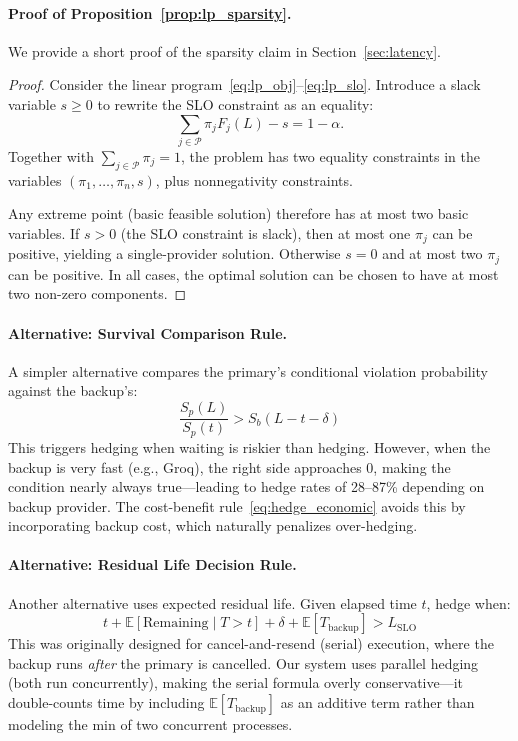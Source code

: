 \paragraph{Proof of Proposition~\ref{prop:lp_sparsity}.}
\label{app:lp_sparsity_proof}
We provide a short proof of the sparsity claim in Section~\ref{sec:latency}.
\begin{proof}
Consider the linear program~\eqref{eq:lp_obj}--\eqref{eq:lp_slo}. Introduce a slack variable $s \ge 0$ to rewrite the SLO constraint as an equality:
\[
\sum_{j \in \mathcal{P}} \pi_j F_j(L) - s = 1 - \alpha.
\]
Together with $\sum_{j \in \mathcal{P}} \pi_j = 1$, the problem has two equality constraints in the variables $(\pi_1, \ldots, \pi_n, s)$, plus nonnegativity constraints.

Any extreme point (basic feasible solution) therefore has at most two basic variables. If $s > 0$ (the SLO constraint is slack), then at most one $\pi_j$ can be positive, yielding a single-provider solution. Otherwise $s = 0$ and at most two $\pi_j$ can be positive. In all cases, the optimal solution can be chosen to have at most two non-zero components.
\end{proof}

\paragraph{Alternative: Survival Comparison Rule.}
A simpler alternative compares the primary's conditional violation probability against the backup's:
\[
\frac{S_p(L)}{S_p(t)} > S_b(L - t - \delta)
\]
This triggers hedging when waiting is riskier than hedging. However, when the backup is very fast (e.g., Groq), the right side approaches 0, making the condition nearly always true---leading to hedge rates of 28--87\% depending on backup provider. The cost-benefit rule~\eqref{eq:hedge_economic} avoids this by incorporating backup cost, which naturally penalizes over-hedging.

\paragraph{Alternative: Residual Life Decision Rule.}
Another alternative uses expected residual life. Given elapsed time $t$, hedge when:
\[
t + \mathbb{E}[\text{Remaining} \mid T > t] + \delta + \mathbb{E}[T_{\text{backup}}] > L_{\text{SLO}}
\]
This was originally designed for cancel-and-resend (serial) execution, where the backup runs \textit{after} the primary is cancelled. Our system uses parallel hedging (both run concurrently), making the serial formula overly conservative---it double-counts time by including $\mathbb{E}[T_{\text{backup}}]$ as an additive term rather than modeling the min of two concurrent processes.

